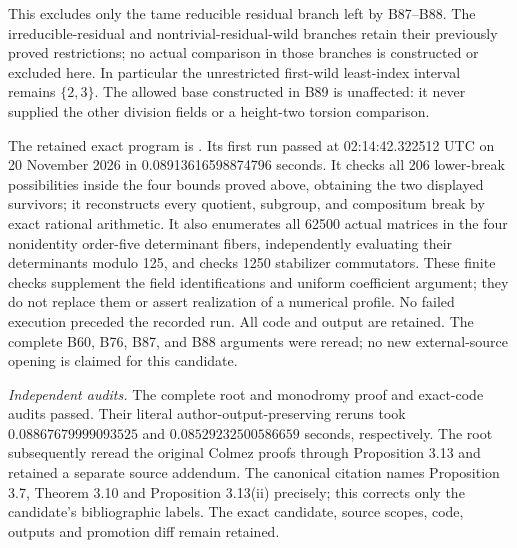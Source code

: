 \begin{remark}
\label{rem:B-RD90-scope}
This excludes only the tame reducible residual branch left
by B87--B88. The irreducible-residual and nontrivial-residual-wild
branches retain their previously proved restrictions; no
actual comparison in those branches is constructed or excluded
here. In particular the unrestricted first-wild least-index
interval remains \(\{2,3\}\). The allowed base constructed
in B89 is unaffected: it never supplied the other division
fields or a height-two torsion comparison.

The retained exact program is
.
Its first run passed at 02:14:42.322512 UTC on 20 November 2026
in 0.08913616598874796 seconds. It checks all 206 lower-break
possibilities inside the four bounds proved above, obtaining
the two displayed survivors; it reconstructs every quotient,
subgroup, and compositum break by exact rational arithmetic.
It also enumerates all 62500 actual matrices in the four
nonidentity order-five determinant fibers, independently
evaluating their determinants modulo 125, and checks 1250
stabilizer commutators. These finite checks supplement the
field identifications and uniform coefficient argument;
they do not replace them or assert realization of a numerical
profile. No failed execution preceded the recorded run.
All code and output are retained. The complete B60, B76,
B87, and B88 arguments were reread; no new external-source
opening is claimed for this candidate.

\smallskip
\noindent\emph{Independent audits.}
The complete root and monodromy proof and exact-code audits passed.
Their literal author-output-preserving reruns took
\(0.08867679999093525\) and
\(0.08529232500586659\) seconds, respectively.
The root subsequently reread the original Colmez proofs through
Proposition 3.13 and retained a separate source addendum. The canonical
citation names Proposition 3.7, Theorem 3.10 and Proposition 3.13(ii)
precisely; this corrects only the candidate's bibliographic labels.
The exact candidate, source scopes, code, outputs and promotion diff
remain retained.
\end{remark}
